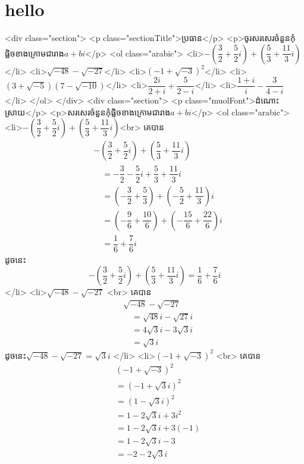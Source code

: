 \section{hello}

<div class="section">
    <p class="sectionTitle">ប្រធាន</p>
    <p>ចូរសរសេរចំនួនកុំផ្លិចខាងក្រោមជារាង$a+bi$</p>
    <ol class="arabic">
        <li>$-\left( \dfrac{3}{2}+\dfrac{5}{2}i\right)+\left( \dfrac{5}{3}+\dfrac{11}{3}i\right)$</li>
        <li>$\sqrt{-48}-\sqrt{-27}$</li>
        <li>$\left( -1+\sqrt{-3}\right)^2$</li>
        <li>$\left( 3+\sqrt{-5}\right)\left( 7-\sqrt{-10}\right)$</li>
        <li>$\dfrac{2i}{2+i}+\dfrac{5}{2-i}$</li>
        <li>$\dfrac{1+i}{i}-\dfrac{3}{4-i}$</li>
    </ol>
</div>
<div class="section">
    <p class="muolFont">ដំណោះស្រាយ</p>
    <p>សរសេរចំនួនកុំផ្លិចខាងក្រោមជារាង$a+bi$</p>
    <ol class="arabic">
        <li>$-\left( \dfrac{3}{2}+\dfrac{5}{2}i\right)+\left( \dfrac{5}{3}+\dfrac{11}{3}i\right)$<br>
            គេបាន
            $$\begin{aligned}
            &-\left( \dfrac{3}{2}+\dfrac{5}{2}i\right)+\left( \dfrac{5}{3}+\dfrac{11}{3}i\right)\\
            &\quad= -\dfrac{3}{2} - \dfrac{5}{2}i + \dfrac{5}{3} + \dfrac{11}{3}i \\
            &\quad= \left(-\dfrac{3}{2} + \dfrac{5}{3}\right) + \left(-\dfrac{5}{2} + \dfrac{11}{3}\right)i \\
            &\quad= \left(-\dfrac{9}{6} + \dfrac{10}{6}\right) + \left(-\dfrac{15}{6} + \dfrac{22}{6}\right)i \\
            &\quad= \dfrac{1}{6} + \dfrac{7}{6}i
            \end{aligned}$$
            ដូចនេះ
            $$\boxed{-\left( \dfrac{3}{2}+\dfrac{5}{2}i\right)+\left( \dfrac{5}{3}+\dfrac{11}{3}i\right)= \dfrac{1}{6} + \dfrac{7}{6}i}$$
        </li>
        <li>$\sqrt{-48}-\sqrt{-27}$
            <br>
            គេបាន
            $$
            \begin{aligned}
            &\sqrt{-48} - \sqrt{-27} \\
            &\quad= \sqrt{48}i - \sqrt{27}i \\
            &\quad= 4\sqrt{3}i - 3\sqrt{3}i \\
            &\quad= \sqrt{3}i
            \end{aligned}
            $$
            ដូចនេះ$\boxed{\sqrt{-48} - \sqrt{-27} = \sqrt{3}i}$
        </li>
        <li>$\left( -1+\sqrt{-3}\right)^2$
            <br>
            គេបាន
            $$
            \begin{aligned}
            &\left( -1+\sqrt{-3}\right)^2 \\
            &= \left( -1 + \sqrt{3}i \right)^2 \\
            &= \left( 1 - \sqrt{3}i \right)^2 \\
            &= 1 - 2\sqrt{3}i + 3i^2 \\
            &= 1 - 2\sqrt{3}i + 3(-1) \\
            &= 1 - 2\sqrt{3}i - 3 \\
            &= -2 - 2\sqrt{3}i
            \end{aligned}
            $$
